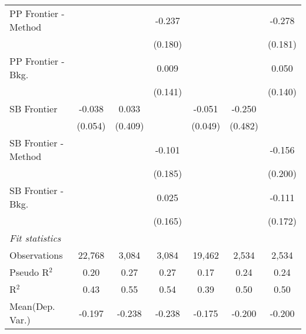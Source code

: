 \begin{tabular}{lcccccc}
   PP Frontier - Method &               &         & -0.237  &               &         & -0.278\\   
                        &               &         & (0.180) &               &         & (0.181)\\   
   PP Frontier - Bkg.   &               &         & 0.009   &               &         & 0.050\\   
                        &               &         & (0.141) &               &         & (0.140)\\   
   SB Frontier          & -0.038        & 0.033   &         & -0.051        & -0.250  &   \\   
                        & (0.054)       & (0.409) &         & (0.049)       & (0.482) &   \\   
   SB Frontier - Method &               &         & -0.101  &               &         & -0.156\\   
                        &               &         & (0.185) &               &         & (0.200)\\   
   SB Frontier - Bkg.   &               &         & 0.025   &               &         & -0.111\\   
                        &               &         & (0.165) &               &         & (0.172)\\   
   \midrule
   \emph{Fit statistics}\\
   Observations         & 22,768        & 3,084   & 3,084   & 19,462        & 2,534   & 2,534\\  
   Pseudo R$^2$         & 0.20          & 0.27    & 0.27    & 0.17          & 0.24    & 0.24\\  
   R$^2$                & 0.43          & 0.55    & 0.54    & 0.39          & 0.50    & 0.50\\  
Mean(Dep. Var.) & -0.197 & -0.238 & -0.238 & -0.175 & -0.200 & -0.200 \\
   

\end{tabular}
